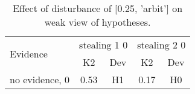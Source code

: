 \begin{table}\begin{tabular}{l|cc|cc}\toprule\multirow{2}{*}{Evidence} & \multicolumn{2}{c}{stealing 1 0}& \multicolumn{2}{c}{stealing 2 0}\\& {K2} & {Dev}& {K2} & {Dev}\\\midrule
no evidence, 0 & \cellcolor{Bittersweet}0.53&\cellcolor{Bittersweet}H1&\cellcolor{Bittersweet}0.17&\cellcolor{Bittersweet}H0\\\bottomrule\end{tabular}\caption{Effect of disturbance of [0.25, 'arbit'] on weak view of hypotheses.}\end{table}
